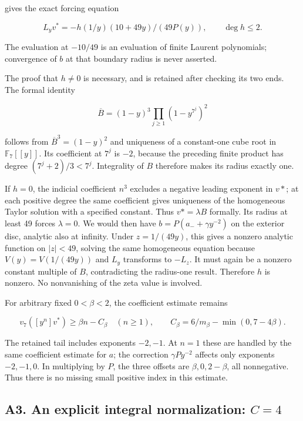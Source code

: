 \documentclass[11pt,a4paper]{article}
\begin{document}
gives the exact forcing equation

\[
L_yv^*=-h(1/y)(10+49y)/(49P(y)),\qquad\deg h\le2.
\]

The evaluation at \(-10/49\) is an evaluation of finite Laurent polynomials; convergence of \(b\) at that boundary radius is never asserted.

The proof that \(h≠0\) is necessary, and is retained after checking its two ends. The formal identity

\[
\overline B=(1-y)^3\prod_{j\ge1}(1-y^{7^j})^2
\]

follows from \(\overline{B}^{3}=(1-y)^{2}\) and uniqueness of a constant-one cube root in \(\mathbb{F}_{7}[[y]]\). Its coefficient at \(7^j\) is \(-2\), because the preceding finite product has degree \((7^j+2)/3<7^j\). Integrality of \(B\) therefore makes its radius exactly one.

If \(h=0\), the indicial coefficient \(n^{3}\) excludes a negative leading exponent in \(v*\); at each positive degree the same coefficient gives uniqueness of the homogeneous Taylor solution with a specified constant. Thus \(v*=λB\) formally. Its radius at least 49 forces \(λ=0\). We would then have \(b=P(a_{-}+γy^{-2})\) on the exterior disc, analytic also at infinity. Under \(z=1/(49y)\), this gives a nonzero analytic function on \(|z|<49\), solving the same homogeneous equation because \(V(y)=V(1/(49y))\) and \(L_y\) transforms to \(-L_z\). It must again be a nonzero constant multiple of \(B\), contradicting the radius-one result. Therefore \(h\) is nonzero. No nonvanishing of the zeta value is involved.

For arbitrary fixed \(0<β<2\), the coefficient estimate remains

\[
v_7([y^n]v^*)\ge\beta n-C_\beta\quad(n\ge1),
\qquad C_\beta=6/m_\beta-\min(0,7-4\beta).
\]

The retained tail includes exponents \(-2,-1\). At \(n=1\) these are handled by the same coefficient estimate for \(a\); the correction \(γPy^{-2}\) affects only exponents \(-2,-1,0\). In multiplying by \(P\), the three offsets are \(β,0,2-β\), all nonnegative. Thus there is no missing small positive index in this estimate.

\hypertarget{a3.-an-explicit-integral-normalization-c4}{%
\subsection{\texorpdfstring{A3. An explicit integral normalization: \(C=4\)}{A3. An explicit integral normalization: C=4}}\label{a3.-an-explicit-integral-normalization-c4}}
\end{document}
